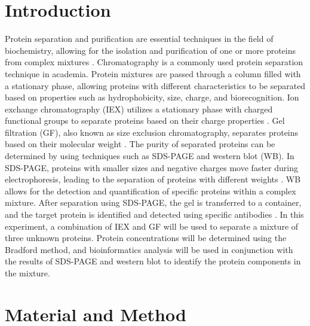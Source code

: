 \documentclass[a4paper,10pt]{article}
\begin{document}
\begin{multicols}{2}
\section{Introduction}


Protein separation and purification are essential techniques in the field of biochemistry, allowing for the isolation and purification of one or more proteins from complex mixtures \cite{liu2020recent}. Chromatography is a commonly used protein separation technique in academia. Protein mixtures are passed through a column filled with a stationary phase, allowing proteins with different characteristics to be separated based on properties such as hydrophobicity, size, charge, and biorecognition. Ion exchange chromatography (IEX) utilizes a stationary phase with charged functional groups to separate proteins based on their charge properties \cite{rajesh2018cellulose}. Gel filtration (GF), also known as size exclusion chromatography, separates proteins based on their molecular weight \cite{cai2017top}. The purity of separated proteins can be determined by using techniques such as SDS-PAGE and western blot (WB). In SDS-PAGE, proteins with smaller sizes and negative charges move faster during electrophoresis, leading to the separation of proteins with different weights \cite{katorcha2018analysis}. WB allows for the detection and quantification of specific proteins within a complex mixture. After separation using SDS-PAGE, the gel is transferred to a container, and the target protein is identified and detected using specific antibodies \cite{desire2023development}. In this experiment, a combination of IEX and GF will be used to separate a mixture of three unknown proteins. Protein concentrations will be determined using the Bradford method, and bioinformatics analysis will be used in conjunction with the results of SDS-PAGE and western blot to identify the protein components in the mixture.

\section{Material and Method}




\end{multicols}
\end{document}
